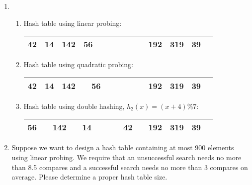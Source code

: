 \documentclass[12pt,a4paper]{article}
\makeatletter
\newtheorem*{solution}{Solution}
\theoremstyle{definition}
\renewenvironment{solution}[1][Solution] {\par\pushQED{\qed}\normalfont\topsep6\p@\@plus6\p@\relax\trivlist\item[\hskip\labelsep\bfseries#1\@addpunct{.}]\ignorespaces}{\popQED\endtrivlist\@endpefalse} \makeatother
\makeatother
\begin{document}
\begin{enumerate}
\begin{solution}
\begin{enumerate}
		[9 ] [  ] 
		
		[10] [  ] $\rightarrow$ [192]
		
		[11] [  ]$\rightarrow$ [39] $\rightarrow$ [319]
	
		[12] [  ]
		
		[13] [  ]
		\item Hash table using linear probing:
		
		\begin{table}[ht]
			\centering
			\begin{tabular}{|c|c|c|c|c|c|c|c|c|c|c|c|c|c|}
				\hline
				
				42 & 14 & 142 &56  &  &  &  & &  &  &192 &319  & 39&\\ \hline 
				
			\end{tabular}
		\end{table}
		
		\item Hash table using quadratic probing:
		

		\begin{table}[ht]
	\centering
	\begin{tabular}{|c|c|c|c|c|c|c|c|c|c|c|c|c|c|}
		\hline
		
				42 & 14 & 142 &  & 56 &  &  &  &  &  &192 &319  & 39&\\ \hline 
		
	\end{tabular}
\end{table}
		
		\item Hash table using double hashing, $h_2 (x) = (x+4)\%7$:
		
		\begin{table}[ht]
	\centering
	\begin{tabular}{|c|c|c|c|c|c|c|c|c|c|c|c|c|c|}
		\hline
		
				56 &  & 142 &  &14  &  &  &    & 42 & &192  & 319& 39 & \\ \hline 
		
	\end{tabular}
\end{table}
	\end{enumerate}
\end{solution}

\item  Suppose we want to design a hash table containing at most 900 elements using
linear probing. We require that an unsuccessful search needs no more than 8.5 compares
and a successful search needs no more than 3 compares on average. Please determine
a proper hash table size.


\end{enumerate}
\end{document}
